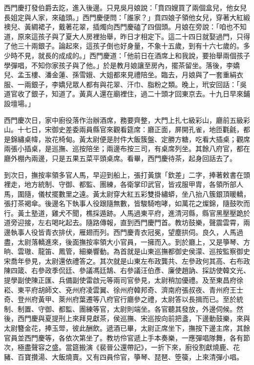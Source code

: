西門慶打發伯爵去訖，進入後邊。只見吳月娘說：「賁四嫂買了兩個盒兒，他女兒長姐定與人家，來磕頭。」西門慶便問：「誰家？」賁四娘子領他女兒，穿著大紅緞襖兒、黃綢裙子，戴著花翠，插燭向西門慶磕了四個頭。月娘在旁說：「咱也不知道，原來這孩子與了夏大人房裡抬舉，昨日才相定下。這二十四日就娶過門，只得了他三十兩銀子。論起來，這孩子倒也好身量，不象十五歲，到有十六七歲的。多少時不見，就長的成成的。」西門慶道：「他前日在酒席上和我說，要抬舉兩個孩子學彈唱，不知你家孩子與了他。」於是教月娘讓至房內，擺茶留坐。落後，李嬌兒、孟玉樓、潘金蓮、孫雪娥、大姐都來見禮陪坐。臨去，月娘與了一套重絹衣服、一兩銀子，李嬌兒眾人都有與花翠、汗巾、脂粉之類。晚上，玳安回話：「吳道官收了銀子，知道了。黃真人還在廟裡住，過二十頭才回東京去。十九日早來鋪設壇場。」

西門慶次日，家中廚役落作治辦酒席，務要齊整，大門上扎七級彩山，廳前五級彩山。十七日，宋御史差委兩員縣官來觀看筵席：廳正面，屏開孔雀，地匝氍毹，都是錦繡桌幃，妝花椅甸。黃太尉便是肘件大飯簇盤、定勝方糖，吃看大插桌；觀席兩張小插桌，是巡撫、巡按陪坐；兩邊布按三司，有桌席列坐。其餘八府官，都在廳外棚內兩邊，只是五果五菜平頭桌席。看畢，西門慶待茶，起身回話去了。

到次日，撫按率領多官人馬，早迎到船上，張打黃旗「欽差」二字，捧著敕書在頭裡走，地方統制、守御、都監、團練，各衛掌印武官，皆戎服甲胄，各領所部人馬，圍隨，儀杖擺數里之遠。黃太尉穿大紅五彩雙掛繡蟒，坐八抬八簇銀頂暖轎，張打茶褐傘。後邊名下執事人役跟隨無數，皆駿騎咆哮，如萬花之燦錦，隨鼓吹而行。黃土塾道，雞犬不聞，樵採遁跡。人馬過東平府，進清河縣，縣官黑壓壓跪於道旁迎接，左右喝叱起去。隨路傳報，直到西門慶門首。教坊鼓樂，聲震雲霄，兩邊執事人役皆青衣排伏，雁翅而列。西門慶青衣冠冕，望塵拱伺。良久，人馬過盡，太尉落轎進來，後面撫按率領大小官員，一擁而入。到於廳上，又是箏琴、方晌、雲璈、龍笛、鳳管，細樂響動。為首就是山東巡撫都御史侯濛、巡按監察御史宋喬年參見，太尉還依禮答之。其次就是山東左布政龔共、左參政何其高、右布政陳四箴、右參政季侃廷、參議馮廷鵠、右參議汪伯彥、廉使趙訥、採訪使韓文光、提學副使陳正匯、兵備副使雷啟元等兩司官參見，太尉稍加優禮。及至東昌府徐崧、東平府胡師文、兗州府凌雲翼、徐州府韓邦奇、濟南府張叔夜、青州府王士奇、登州府黃甲、萊州府葉遷等八府官行廳參之禮，太尉答以長揖而已。至於統制、制置、守御、都監、團練等官，太尉則端坐。各官聽其發放，外邊伺候。然後，西門慶與夏提刑上來拜見獻茶，侯巡撫、宋巡按向前把盞，下邊動鼓樂，來與太尉簪金花，捧玉斝，彼此酬飲。遞酒已畢，太尉正席坐下，撫按下邊主席，其餘官員並西門慶等，各依次第坐了。教坊伶官遞上手本奏樂，一應彈唱隊舞，各有節次，極盡聲容之盛。當筵搬演《裴晉公還帶記》，一折下來，廚役割獻燒鹿、花豬、百寶攢湯、大飯燒賣。又有四員伶官，箏琴、琵琶、箜篌，上來清彈小唱。

